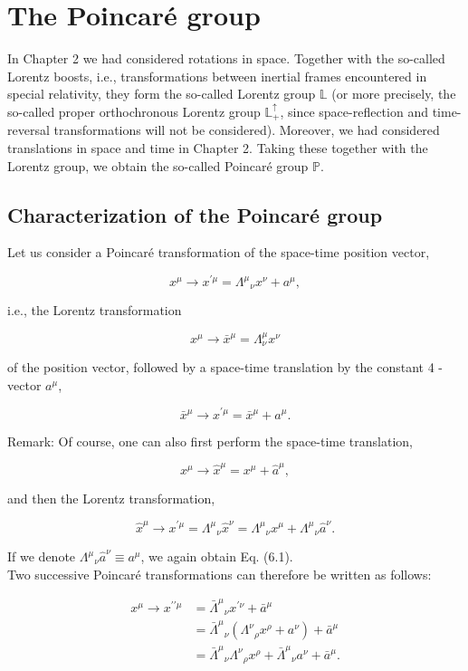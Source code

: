 \documentclass[10pt, letterpaper]{article}
\begin{document}
\pagebreak


\section{The Poincaré group}
In Chapter 2 we had considered rotations in space. Together with the so-called Lorentz boosts, i.e., transformations between inertial frames encountered in special relativity, they form the so-called Lorentz group $\mathbb{L}$ (or more precisely, the so-called proper orthochronous Lorentz group $\mathbb{L}_{+}^{\uparrow}$, since space-reflection and time-reversal transformations will not be considered). Moreover, we had considered translations in space and time in Chapter 2. Taking these together with the Lorentz group, we obtain the so-called Poincaré group $\mathbb{P}$.

\subsection{Characterization of the Poincaré group}
Let us consider a Poincaré transformation of the space-time position vector,

$$
x^{\mu} \longrightarrow x^{\prime \mu}=\Lambda^{\mu}{ }_{\nu} x^{\nu}+a^{\mu},
$$

i.e., the Lorentz transformation

$$
x^{\mu} \longrightarrow \bar{x}^{\mu}=\Lambda_{\nu}^{\mu} x^{\nu}
$$

of the position vector, followed by a space-time translation by the constant 4 -vector $a^{\mu}$,

$$
\bar{x}^{\mu} \longrightarrow x^{\prime \mu}=\bar{x}^{\mu}+a^{\mu} .
$$

Remark: Of course, one can also first perform the space-time translation,

$$
x^{\mu} \longrightarrow \hat{x}^{\mu}=x^{\mu}+\hat{a}^{\mu},
$$

and then the Lorentz transformation,

$$
\hat{x}^{\mu} \longrightarrow x^{\prime \mu}=\Lambda^{\mu}{ }_{\nu} \hat{x}^{\nu}=\Lambda^{\mu}{ }_{\nu} x^{\mu}+\Lambda^{\mu}{ }_{\nu} \hat{a}^{\nu} .
$$

If we denote $\Lambda^{\mu}{ }_{\nu} \hat{a}^{\nu} \equiv a^{\mu}$, we again obtain Eq. (6.1).\\
Two successive Poincaré transformations can therefore be written as follows:

$$
\begin{aligned}
x^{\mu} \longrightarrow x^{\prime \prime \mu} & =\bar{\Lambda}^{\mu}{ }_{\nu} x^{\prime \nu}+\bar{a}^{\mu} \\
& =\bar{\Lambda}^{\mu}{ }_{\nu}\left(\Lambda^{\nu}{ }_{\rho} x^{\rho}+a^{\nu}\right)+\bar{a}^{\mu} \\
& =\bar{\Lambda}^{\mu}{ }_{\nu} \Lambda^{\nu}{ }_{\rho} x^{\rho}+\bar{\Lambda}^{\mu}{ }_{\nu} a^{\nu}+\bar{a}^{\mu} .
\end{aligned}
$$
\end{document}

